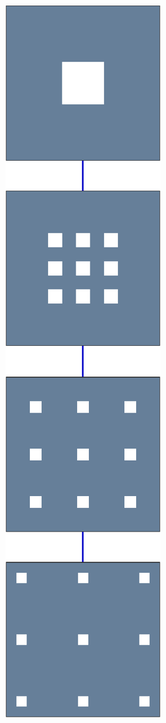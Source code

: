 \begin{figure}[!ht]\centering
\begin{subfigure}[b]{0.09\textwidth}\centering
	\includegraphics[width=\textwidth]{figures/exple-better-support/tree_classic.pdf}

\end{subfigure}
\end{figure}
